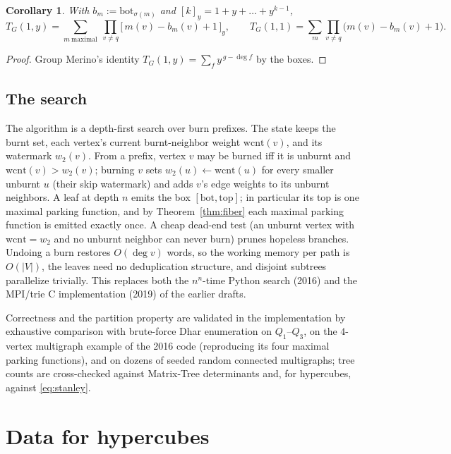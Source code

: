 \documentclass[11pt]{amsart}
\newtheorem{corollary}[theorem]{Corollary}
\theoremstyle{definition}
\begin{document}
\begin{corollary}\label{cor:tutte}
With $b_m := \mathrm{bot}_{\sigma(m)}$ and $[k]_y = 1+y+\dots+y^{k-1}$,
\[
T_G(1,y)=\sum_{m\ \mathrm{maximal}}\ \prod_{v\ne q}
  \bigl[\,m(v)-b_m(v)+1\,\bigr]_y,
\qquad
T_G(1,1)=\sum_m \prod_{v\ne q}\bigl(m(v)-b_m(v)+1\bigr).
\]
\end{corollary}

\begin{proof}
Group Merino's identity $T_G(1,y)=\sum_{f}y^{\,g-\deg f}$ \cite{merino97}
by the boxes.
\end{proof}

\subsection*{The search}
The algorithm is a depth-first search over burn prefixes. The state keeps
the burnt set, each vertex's current burnt-neighbor weight
$\mathrm{wcnt}(v)$, and its watermark $w_2(v)$. From a prefix, vertex $v$
may be burned iff it is unburnt and $\mathrm{wcnt}(v) > w_2(v)$; burning $v$
sets $w_2(u)\leftarrow\mathrm{wcnt}(u)$ for every smaller unburnt $u$
(their skip watermark) and adds $v$'s edge weights to its unburnt
neighbors. A leaf at depth $n$ emits the box
$[\mathrm{bot},\mathrm{top}]$; in particular its top is one maximal parking
function, and by Theorem~\ref{thm:fiber} each maximal parking function is
emitted exactly once. A cheap dead-end test (an unburnt vertex with
$\mathrm{wcnt}=w_2$ and no unburnt neighbor can never burn) prunes hopeless
branches. Undoing a burn restores $O(\deg v)$ words, so the working memory
per path is $O(|V|)$, the leaves need no deduplication structure, and
disjoint subtrees parallelize trivially. This replaces both the $n^n$-time
Python search (2016) and the MPI/trie C implementation (2019) of the
earlier drafts.

Correctness and the partition property are validated in the implementation
by exhaustive comparison with brute-force Dhar enumeration on $Q_1$--$Q_3$,
on the $4$-vertex multigraph example of the 2016 code (reproducing its four
maximal parking functions), and on dozens of seeded random connected
multigraphs; tree counts are cross-checked against Matrix-Tree determinants
and, for hypercubes, against \eqref{eq:stanley}.

\section{Data for hypercubes}\label{sec:data}
\end{document}
